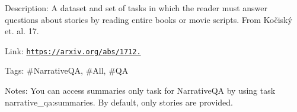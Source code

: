 Description\+: A dataset and set of tasks in which the reader must answer questions about stories by reading entire books or movie scripts. From Kočiský et. al. \textquotesingle{}17.

Link\+: \href{https://arxiv.org/abs/1712.07040'}{\tt https\+://arxiv.\+org/abs/1712.\textquotesingle{}}

Tags\+: \#\+Narrative\+QA, \#\+All, \#\+QA

Notes\+: You can access summaries only task for Narrative\+QA by using task \textquotesingle{}narrative\+\_\+qa\+:summaries\textquotesingle{}. By default, only stories are provided. 